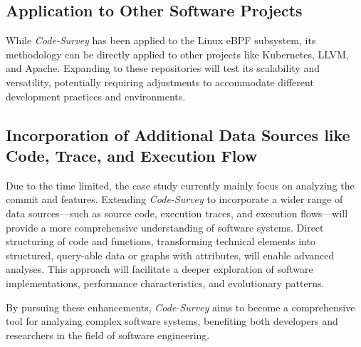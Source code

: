 \subsection{Application to Other Software Projects}

While \emph{Code-Survey} has been applied to the Linux eBPF subsystem, its methodology can be directly applied to other projects like Kubernetes, LLVM, and Apache. Expanding to these repositories will test its scalability and versatility, potentially requiring adjustments to accommodate different development practices and environments.

\subsection{Incorporation of Additional Data Sources like Code, Trace, and Execution Flow}

Due to the time limited, the case study currently mainly focus on analyzing the commit and features. Extending \emph{Code-Survey} to incorporate a wider range of data sources—such as source code, execution traces, and execution flows—will provide a more comprehensive understanding of software systems. Direct structuring of code and functions, transforming technical elements into structured, query-able data or graphs with attributes, will enable advanced analyses. This approach will facilitate a deeper exploration of software implementations, performance characteristics, and evolutionary patterns.

By pursuing these enhancements, \emph{Code-Survey} aims to become a comprehensive tool for analyzing complex software systems, benefiting both developers and researchers in the field of software engineering.

% 
% 